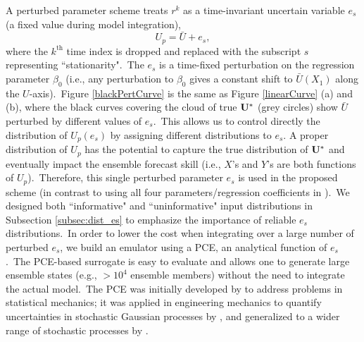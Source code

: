	
		A perturbed parameter scheme treats $r^k$ as a time-invariant
		uncertain variable $e_s$ (a fixed value during model integration),
		\begin{equation} \label{perturbedParm}
			U_p = \bar{U} + e_s,			
		\end{equation}
		where the $k^{\text{th}}$ time index is dropped and replaced with
		the subscript $s$ representing ``stationarity".\
		The $e_s$ is a time-fixed perturbation on the regression parameter $\beta_0$ 
		(i.e., any perturbation to $\beta_0$ gives a constant 
		shift to $\bar{U}(X_1)$ along the $U$-axis).\
		Figure {\ref{blackPertCurve}} is the same as Figure {\ref{linearCurve}} (a) and (b), 
		where the black curves covering the cloud of true $\bold{U^*}$ (grey circles) show $\bar{U}$ perturbed by different values of $e_s$.\ 
		This allows us to control directly the distribution of $U_p(e_s)$ by assigning different distributions to $e_s$.
		A proper distribution of $U_p$ has the potential to capture the 
		true distribution of $\bold{U^*}$ and eventually impact the ensemble forecast skill
		(i.e., $X$'s and $Y$'s are both functions of $U_p$).\
		Therefore, this single perturbed parameter $e_s$ is used 
		in the proposed scheme (in contrast to using 
		all four parameters/regression coefficients in \citet{Arnold13}).\
		We designed both ``informative" and ``uninformative" 
		input distributions in Subsection \ref{subsec:dist_es}
		to emphasize the importance of reliable $e_s$ distributions.\
		In order to lower the cost when integrating over a large number of perturbed $e_s$,
		we build an emulator using a PCE, an analytical function of $e_s$.\ 
		The PCE-based surrogate is easy to evaluate and allows
		one to generate large ensemble states (e.g., $> 10^4$ ensemble members)
		without the need to integrate the actual model.\
		The PCE was initially developed by  {\citet{Wiener38}} 
		to address problems in statistical mechanics;
		it was applied in engineering mechanics to quantify
		uncertainties in stochastic Gaussian processes
		by {\citet{Ghanem90}}, and generalized to a wider range of stochastic processes by {\citet{Xiu02}}.

 

		
		
